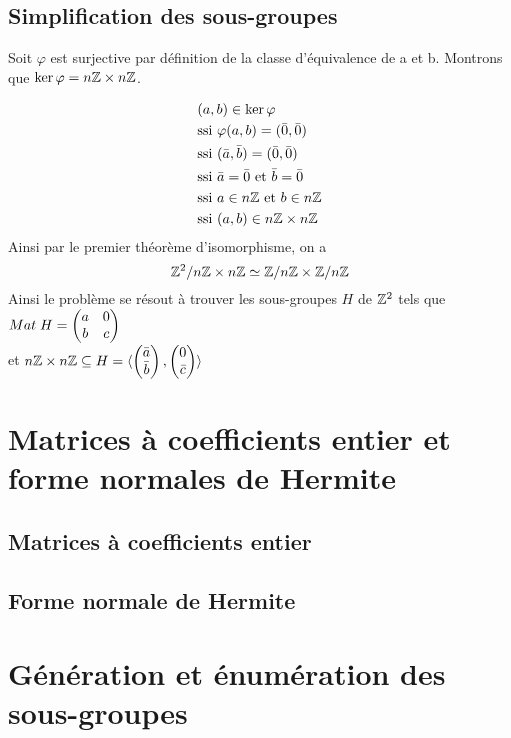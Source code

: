 \documentclass[11pt]{article}
\begin{document}
\newpage
\subsection{Simplification des sous-groupes}
Soit 
$\varphi$ est surjective par définition de la classe d'équivalence de a et b.
Montrons que $\ker \varphi = n\mathbb Z \times n\mathbb Z$.

\begin{equation*}
	\begin{split}
		&(a,b) \in \ker \varphi \\
		&\text{ssi } \varphi(a,b) = (\bar 0, \bar 0)\\
		&\text{ssi } (\bar a, \bar b) = (\bar 0, \bar 0)\\
		&\text{ssi } \bar a = \bar 0 \text{ et } \bar b = \bar 0\\
		&\text{ssi } a \in n\mathbb Z \text{ et } b \in n\mathbb Z\\
		&\text{ssi } (a,b) \in  n\mathbb Z \times n\mathbb Z
	\end{split}
\end{equation*}
Ainsi par le premier théorème d'isomorphisme, on a
$$\mathbb Z^2/n\mathbb Z \times n\mathbb Z \simeq \mathbb Z/n\mathbb Z \times \mathbb Z/n\mathbb Z $$
Ainsi le problème se résout à trouver les sous-groupes $H$ de $\mathbb Z^2$ tels que
$Mat \; H = \begin{pmatrix} a & 0\\ b & c \end{pmatrix}$\\
et
$n\mathbb Z \times n\mathbb Z \subseteq H = \langle \begin{pmatrix} \bar a\\ \bar b \end{pmatrix}, \begin{pmatrix} 0\\ \bar c \end{pmatrix} \rangle$


\section{Matrices à coefficients entier et forme normales de Hermite}
\subsection{Matrices à coefficients entier}
\subsection{Forme normale de Hermite}

\section {Génération et énumération des sous-groupes}
\end{document}
